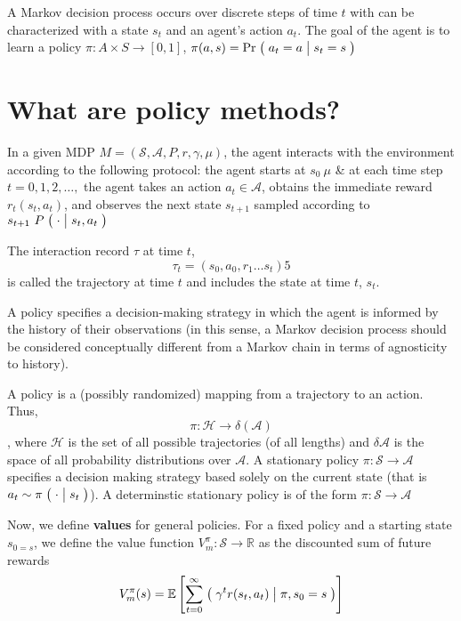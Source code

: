 \documentclass[12pt,reqno]{amsart}
\newcommand{\Cond}[2]{\bigm( {#1} \bigm\vert {#2}\bigm)}
\newcommand{\E}{\mathbb E}
\begin{document}
A Markov decision process occurs over discrete steps of time $t$ with can be characterized with a state $s_{t}$ and an agent's action $a_{t}$. The goal of the agent is to learn a policy $\pi: A \times S \rightarrow [0,1]$, $ \pi(a,s) = \Pr\Cond{a_{t} = a}{s_{t} = s} $
\section{What are policy methods?}
In a given MDP $M = (\mathcal{S},\mathcal{A}, P, r, \gamma, \mu)$, the agent interacts with the environment according to the following protocol: the agent starts at $s_{0} ~ \mu$ \& at each time step $t = 0,1,2,\ldots,$ the agent takes an action $a_{t} \in \mathcal{A}$, obtains the immediate reward $r_{t}(s_{t},a_{t})$, and observes the next state $s_{t+1}$ sampled according to $s_{t+1} ~ P \Cond{\cdot}{s_{t},a_{t}}$

The interaction record $\tau$ at time $t$,
\begin{equation*}
\tau_{t} = (s_{0},a_{0},r_{1} \ldots s_{t})5
\end{equation*}
is called the trajectory at time $t$ and includes the state at time $t$, $s_{t}$.

A policy specifies a decision-making strategy in which the agent is informed by the history of their observations (in this sense, a Markov decision process should be considered conceptually different from a Markov chain in terms of agnosticity to history). 

A policy is a (possibly randomized) mapping from a trajectory to an action. Thus,
\begin{equation*}
\pi: \mathcal{H} \rightarrow \delta(\mathcal{A})
\end{equation*}
, where $\mathcal{H}$ is the set of all possible trajectories (of all lengths) and $\delta \mathcal{A}$ is the space of all probability distributions over $\mathcal{A}$. A stationary policy $\pi : \mathcal{S} \rightarrow \mathcal{A}$ specifies a decision making strategy based solely on the current state (that is $a_{t} \sim \pi \Cond{\cdot}{s_{t}} $). A determinstic stationary policy is of the form $\pi: \mathcal{S} \rightarrow \mathcal{A}$

Now, we define \textbf{values} for general policies. For a fixed policy and a starting state $s_{0 = s}$, we define the value function $V_{m}^{\pi}: \mathcal{S} \rightarrow \mathbb{R}$ as the discounted sum of future rewards
\begin{equation}\label{eqn:Values}
V_{m}^{\pi}(s) = \E\left[ \sum\limits_{t = 0}^{\infty} \Cond{\gamma^{t}r(s_{t},a_{t})}{\pi, s_{0} = s}   \right]
\end{equation}
\end{document}

